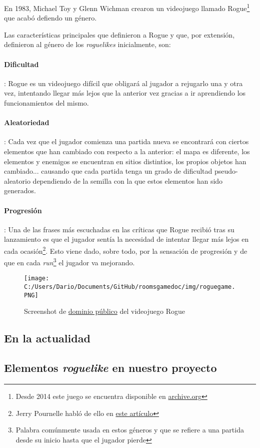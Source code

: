 En 1983, Michael Toy y Glenn Wichman crearon un videojuego llamado Rogue\footnote{Desde 2014 este juego se encuentra disponible en \href{https://archive.org/details/msdos_Rogue_1983}{archive.org}} que acabó defiendo un género.

Las características principales que definieron a Rogue y que, por extensión, definieron al género de los \textit{roguelikes} inicialmente, son:

\paragraph{Dificultad}: Rogue es un videojuego difícil que obligará al jugador a rejugarlo una y otra vez, intentando llegar más lejos que la anterior vez gracias a ir aprendiendo los funcionamientos del mismo.

\paragraph{Aleatoriedad}: Cada vez que el jugador comienza una partida nueva se encontrará con ciertos elementos que han cambiado con respecto a la anterior: el mapa es diferente, los elementos y enemigos se encuentran en sitios distintios, los propios objetos han cambiado... causando que cada partida tenga un grado de dificultad pseudo-aleatorio dependiendo de la semilla con la que estos elementos han sido generados.

\paragraph{Progresión}: Una de las frases más escuchadas en las críticas que Rogue recibió tras su lanzamiento es que el jugador sentía la necesidad de intentar llegar más lejos en cada ocasión\footnote{Jerry Pournelle habló de ello en \href{http://archive.org/stream/byte-magazine-1984-03/1984_03_BYTE_09-03_Simulation#page/n47/mode/2up}{este artículo}}. Esto viene dado, sobre todo, por la sensación de progresión y de que en cada \textit{run}\footnote{Palabra comúnmente usada en estos géneros y que se refiere a una partida desde su inicio hasta que el jugador pierde} el jugador va mejorando.  

\begin{figure}[h!]
		\texttt{[image: C:/Users/Dario/Documents/GitHub/roomsgamedoc/img/roguegame.PNG]}
	\caption{Screenshot de \href{https://en.wikipedia.org/wiki/File:Rogue_Unix_Screenshot_CAR.PNG}{dominio público} del videojuego Rogue}
	\label{fig:roguegame}
\end{figure}

\subsection{En la actualidad}

\subsection{Elementos \textit{roguelike} en nuestro proyecto}